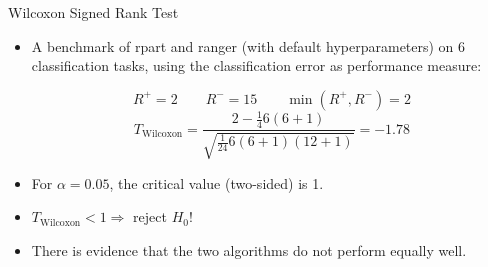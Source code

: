\documentclass[11pt,compress,t,notes=noshow, aspectratio=169, xcolor=table]{beamer}
\begin{document}
\begin{frame}{Wilcoxon Signed Rank Test}
    \begin{itemize}
        \item A benchmark of rpart and ranger (with default hyperparameters) on 6 classification tasks, using the classification error as performance measure:
    {
        \scriptsize
        
    }

$$
    R^{+} = 2\qquad R^{-} = 15\qquad \min(R^{+}, R^{-}) = 2
    $$
    $$
    T_{\text{Wilcoxon}} = \frac{2 - \frac{1}{4}6(6 + 1)}{\sqrt{\frac{1}{24}6(6 + 1)(12 + 1)}} = - 1.78
    $$
    \item For $\alpha = 0.05$, the critical value (two-sided) is 1.
    \item $T_{\text{Wilcoxon}} < 1 \Rightarrow$ reject $H_0$!
    \item There is evidence that the two algorithms do not perform equally well.
\end{itemize}

\end{frame}
\end{document}
